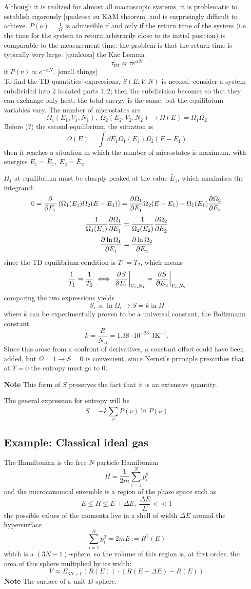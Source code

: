 Although it is realized for almost all macroscopic systems, it is problematic
to establish rigorously [qualcosa su KAM theorem] and is surprisingly difficult to
achieve. $P(\nu)=\frac{1}{\Omega}$ is admissible if and only if the return time
of the system (i.e. the time for the system to return arbitrarily close to its
initial position) is comparable to the measurement time: the problem is that
the return time is typically very large. [qualcosa] the Kac Lemma
$$\tau_\text{ret} \propto\tau e^{\alpha N}$$
if $P(\nu)\propto e^{-\alpha N}$. [small things]\\

To find the TD quantities' expressions, $S(E,V,N)$ is needed:
consider a system subdivided into 2 isolated parts $1,2$; then the subdivision
becomes so that they can exchange only heat: the total energy is the same, but the
equilibrium variables vary. The number of microstates are
$$\Omega_1(E_1,V_1,N_1),\; \Omega_2(E_2,V_2,N_2)\to\Omega(E)=\Omega_1\Omega_2$$
Before (?) the second equilibrium, the situation is
$$\Omega(E) = \int \dd E_1 \Omega_1(E_1)\Omega_2(E-E_1)$$
then it reaches a situation in which the number of microstates is maximum,
with energies $E_1=\bar E_1,\;E_2=\bar E_2$.

$\Omega_1$ at equilibrium must be sharply peaked at the value $\bar E_1$, which
maximises the integrand:
$$0=\pdv[]{}{E_1} \left(\Omega_1(E_1)\Omega_2(E-E_1)\right) =
\pdv[]{\Omega_1}{E_1}(E_1)\Omega_2(E-E_1) - \Omega_1(E_1)\pdv[]{\Omega_2}{E_2}$$
$$\frac{1}{\Omega_1(E_1)}\pdv[]{\Omega_1}{E_1} = \frac{1}{\Omega_2(E_2)}
\pdv[]{\Omega_2}{E_2}$$
$$\pdv[]{\ln\Omega_1}{E_1} = \pdv[]{\ln\Omega_2}{E_2}$$
since the TD equilibrium condition is $T_1 = T_2$, which means
$$\frac{1}{T_1} = \frac{1}{T_2} \iff \eval{\pdv[]{S}{E_1}}_{V_1,N_1} =
\eval{\pdv[]{S}{E_2}}_{V_2,N_2}$$ 
comparing the two expressions yields
$$S_i\propto\ln\Omega_i \to S = k\ln\Omega$$
where $k$ can be experimentally proven to be a universal constant, the Boltzmann
constant
$$k = \frac{R}{N_A} = 1.38\cdot10^{-23}\text{ JK}^{-1}.$$
Since this arose from a confront of derivatives, a constant offset could have
been added, but $\Omega=1\to S=0$ is convenient, since Nernst's principle
prescribes that at $T=0$ the entropy must go to 0.

\textbf{Note} This form of $S$ preserves the fact that it is an extensive
quantity.

The general expression for entropy will be
$$S = -k\sum_{\nu}^{}P(\nu)\ln P(\nu)$$
\subsection{Example: Classical ideal gas}
The Hamiltonian is the free $N$ particle Hamiltonian
$$H = \frac{1}{2m}\sum_{i=1}^{N}p_i^2$$
and the microcanonical ensemble is a region of the phase space such as
$$E\leq H\leq E+\Delta E,\;\frac{\Delta E}{E}<<1$$
the possible values of the momenta live in a shell of width $\Delta E$ around
the hypersurface
$$\sum_{i=1}^{N}p^2_i = 2mE:=R^2(E)$$
which is a $(3N-1)$-sphere, so the volume of this region is, at first order, the
area of this sphere multiplied by its width:
$$V\approx \Sigma_{3N+1}(R(E))\cdot(R(E+\Delta E) - R(E))$$
\textbf{Note} The surface of a unit $D$-sphere.

